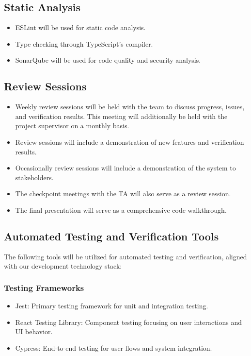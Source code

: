 \documentclass[12pt, titlepage]{article}
\begin{document}
\subsection*{Static Analysis}
\begin{itemize}
  \item ESLint will be used for static code analysis.
  \item Type checking through TypeScript's compiler.
  \item SonarQube will be used for code quality and security analysis.
\end{itemize}

\subsection*{Review Sessions}
\begin{itemize}
  \item Weekly review sessions will be held with the team to discuss progress, issues, and verification results. This meeting will additionally be held with the project supervisor on a monthly basis.
  \item Review sessions will include a demonstration of new features and verification results.
  \item Occasionally review sessions will include a demonstration of the system to stakeholders.
  \item The checkpoint meetings with the TA will also serve as a review session.
  \item The final presentation will serve as a comprehensive code walkthrough.
\end{itemize}

\subsection{Automated Testing and Verification Tools}
The following tools will be utilized for automated testing and verification, aligned with our development technology stack:

\subsubsection*{Testing Frameworks}
\begin{itemize}
    \item Jest: Primary testing framework for unit and integration testing.
    \item React Testing Library: Component testing focusing on user interactions and UI behavior.
    \item Cypress: End-to-end testing for user flows and system integration.
\end{itemize}
\end{document}
